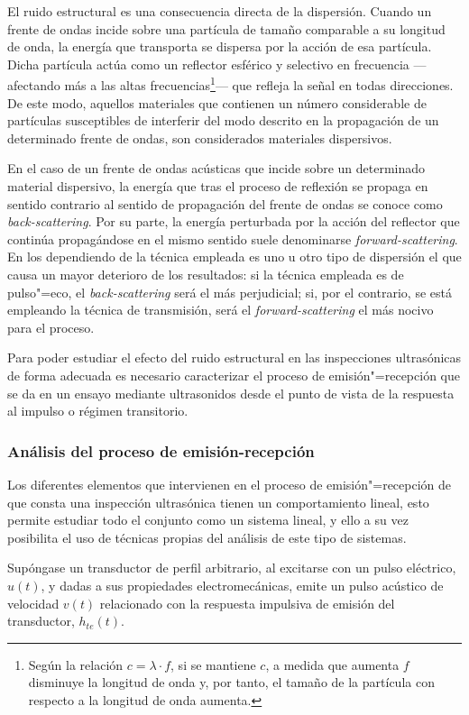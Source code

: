 El ruido estructural es una consecuencia directa de la dispersión. Cuando un frente de ondas incide sobre una partícula de tamaño comparable a su longitud de onda, la energía que transporta se dispersa por la acción de esa partícula. Dicha partícula actúa como un reflector esférico y selectivo en frecuencia ---afectando más a las altas frecuencias\footnote{Según la relación $c = \lambda\cdot f$, si se mantiene $c$, a medida que aumenta $f$ disminuye la longitud de onda y, por tanto, el tamaño de la partícula con respecto a la longitud de onda aumenta.}--- que refleja la señal en todas direcciones. De este modo, aquellos materiales que contienen un número considerable de partículas susceptibles de interferir del modo descrito en la propagación de un determinado frente de ondas, son considerados materiales dispersivos.\par
En el caso de un frente de ondas acústicas que incide sobre un determinado material dispersivo, la energía que tras el proceso de reflexión se propaga en sentido contrario al sentido de propagación del frente de ondas se conoce como \emph{back-scattering}. Por su parte, la energía perturbada por la acción del reflector que continúa propagándose en el mismo sentido suele denominarse \emph{forward-scattering}. En los  dependiendo de la técnica empleada es uno u otro tipo de dispersión el que causa un mayor deterioro de los resultados: si la técnica empleada es de pulso"=eco, el \emph{back-scattering} será el más perjudicial; si, por el contrario, se está empleando la técnica de transmisión, será el \emph{forward-scattering} el más nocivo para el proceso.\par
Para poder estudiar el efecto del ruido estructural en las inspecciones ultrasónicas de forma adecuada es necesario caracterizar el proceso de emisión"=recepción que se da en un ensayo mediante ultrasonidos desde el punto de vista de la respuesta al impulso o régimen transitorio.


\subsubsection{Análisis del proceso de emisión-recepción}

Los diferentes elementos que intervienen en el proceso de emisión"=recepción de que consta una inspección ultrasónica tienen un comportamiento lineal, esto permite estudiar todo el conjunto como un sistema lineal, y ello a su vez posibilita el uso de técnicas propias del análisis de este tipo de sistemas.\par
Supóngase un transductor de perfil arbitrario, al excitarse con un pulso eléctrico, $u(t)$, y dadas a sus propiedades electromecánicas, emite un pulso acústico de velocidad $v(t)$ relacionado con la respuesta impulsiva de emisión del transductor, $h_{te}(t)$.

